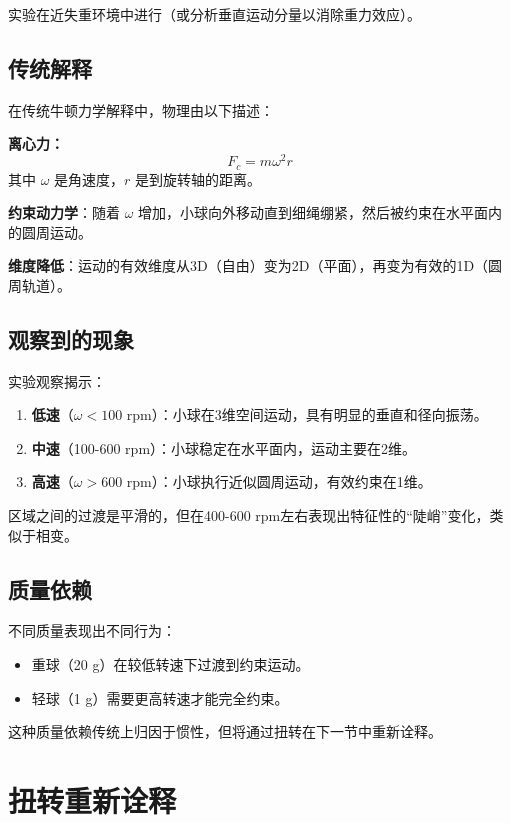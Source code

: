 \documentclass[12pt,a4paper]{article}
\begin{document}
实验在近失重环境中进行（或分析垂直运动分量以消除重力效应）。

\subsection{传统解释}

在传统牛顿力学解释中，物理由以下描述：

\textbf{离心力：}
\begin{equation}
    F_c = m\omega^2 r
\end{equation}
其中 $\omega$ 是角速度，$r$ 是到旋转轴的距离。

\textbf{约束动力学}：随着 $\omega$ 增加，小球向外移动直到细绳绷紧，然后被约束在水平面内的圆周运动。

\textbf{维度降低}：运动的有效维度从3D（自由）变为2D（平面），再变为有效的1D（圆周轨道）。

\subsection{观察到的现象}

实验观察揭示：
\begin{enumerate}
    \item \textbf{低速}（$\omega < 100$ rpm）：小球在3维空间运动，具有明显的垂直和径向振荡。
    \item \textbf{中速}（100-600 rpm）：小球稳定在水平面内，运动主要在2维。
    \item \textbf{高速}（$\omega > 600$ rpm）：小球执行近似圆周运动，有效约束在1维。
\end{enumerate}

区域之间的过渡是平滑的，但在400-600 rpm左右表现出特征性的``陡峭''变化，类似于相变。

\subsection{质量依赖}

不同质量表现出不同行为：
\begin{itemize}
    \item 重球（20 g）在较低转速下过渡到约束运动。
    \item 轻球（1 g）需要更高转速才能完全约束。
\end{itemize}

这种质量依赖传统上归因于惯性，但将通过扭转在下一节中重新诠释。

\section{扭转重新诠释}
\label{sec:dual}
\end{document}
